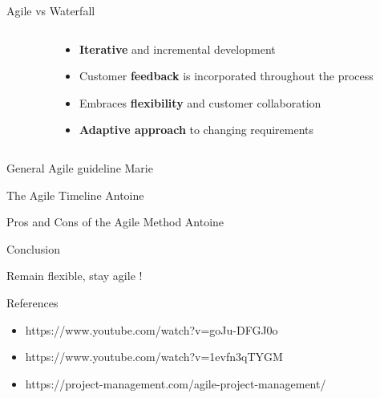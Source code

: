 \documentclass[10pt]{beamer}
\begin{document}
\begin{frame}{Agile vs Waterfall}
  \vspace{2cm}
  \begin{columns}[T]

    \begin{column}{0.5\textwidth}
    \end{column}

    \begin{column}{0.5\textwidth}
      \begin{itemize}
        \item<2-> \textbf{Iterative} and incremental development 
        \item<3-> Customer \textbf{feedback} is incorporated throughout the process
        \item<4-> Embraces \textbf{flexibility} and customer collaboration
        \item<5-> \textbf{Adaptive approach }to changing requirements
      \end{itemize}
    \end{column}

  \end{columns}
\end{frame}

\begin{frame}{General Agile guideline}
    Marie
\end{frame}

\begin{frame}{The Agile Timeline}
    Antoine
\end{frame}

\begin{frame}{Pros and Cons of the Agile Method}
    Antoine
\end{frame}

\begin{frame}{Conclusion}

  Remain flexible, stay agile !
  
\end{frame}

\begin{frame}{References}
  \begin{itemize}
    \item https://www.youtube.com/watch?v=goJu-DFGJ0o
    \item https://www.youtube.com/watch?v=1evfn3qTYGM
    \item https://project-management.com/agile-project-management/
  \end{itemize}
\end{frame}
\end{document}
